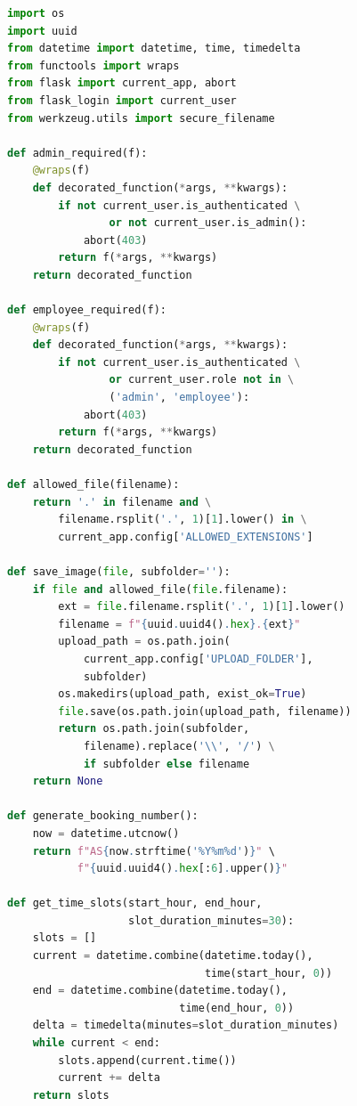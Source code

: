 \documentclass[14pt,a4paper,oneside]{extarticle}
\begin{document}
\begin{lstlisting}[language=Python, caption={Вспомогательные функции (app/utils.py)}, label={lst:full_utils}]
import os
import uuid
from datetime import datetime, time, timedelta
from functools import wraps
from flask import current_app, abort
from flask_login import current_user
from werkzeug.utils import secure_filename

def admin_required(f):
    @wraps(f)
    def decorated_function(*args, **kwargs):
        if not current_user.is_authenticated \
                or not current_user.is_admin():
            abort(403)
        return f(*args, **kwargs)
    return decorated_function

def employee_required(f):
    @wraps(f)
    def decorated_function(*args, **kwargs):
        if not current_user.is_authenticated \
                or current_user.role not in \
                ('admin', 'employee'):
            abort(403)
        return f(*args, **kwargs)
    return decorated_function

def allowed_file(filename):
    return '.' in filename and \
        filename.rsplit('.', 1)[1].lower() in \
        current_app.config['ALLOWED_EXTENSIONS']

def save_image(file, subfolder=''):
    if file and allowed_file(file.filename):
        ext = file.filename.rsplit('.', 1)[1].lower()
        filename = f"{uuid.uuid4().hex}.{ext}"
        upload_path = os.path.join(
            current_app.config['UPLOAD_FOLDER'],
            subfolder)
        os.makedirs(upload_path, exist_ok=True)
        file.save(os.path.join(upload_path, filename))
        return os.path.join(subfolder,
            filename).replace('\\', '/') \
            if subfolder else filename
    return None

def generate_booking_number():
    now = datetime.utcnow()
    return f"AS{now.strftime('%Y%m%d')}" \
           f"{uuid.uuid4().hex[:6].upper()}"

def get_time_slots(start_hour, end_hour,
                   slot_duration_minutes=30):
    slots = []
    current = datetime.combine(datetime.today(),
                               time(start_hour, 0))
    end = datetime.combine(datetime.today(),
                           time(end_hour, 0))
    delta = timedelta(minutes=slot_duration_minutes)
    while current < end:
        slots.append(current.time())
        current += delta
    return slots


\end{lstlisting}
\end{document}
